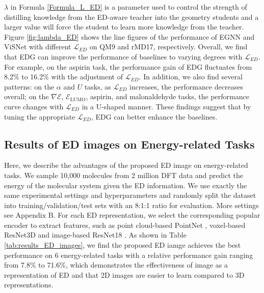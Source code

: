 \documentclass{article}
\begin{document}
$\lambda$ in Formula \ref{Formula_L_ED} is a parameter used to control the strength of distilling knowledge from the ED-aware teacher into the geometry students and a larger value will force the student to learn more knowledge from the teacher. Figure \ref{fig:lambda_ED} shows the line figures of the performance of EGNN and ViSNet with different $\mathcal{L}_{ED}$ on QM9 and rMD17, respectively. Overall, we find that EDG can improve the performance of baselines to varying degrees with $\mathcal{L}_{ED}$. For example, on the aspirin task, the performance gain of EDG fluctuates from 8.2\% to 16.2\% with the adjustment of $\mathcal{L}_{ED}$. In addition, we also find several patterns: on the $\alpha$ and $U$ tasks, as $\mathcal{L}_{ED}$ increases, the performance decreases overall; on the $\nabla \mathcal{E}$, $\mathcal{E}_\text{LUMO}$, aspirin, and malonaldehyde tasks, the performance curve changes with $\mathcal{L}_{ED}$ in a U-shaped manner. These findings suggest that by tuning the appropriate $\mathcal{L}_{ED}$, EDG can better enhance the baselines.




\subsection{Results of ED images on Energy-related Tasks}

Here, we describe the advantages of the proposed ED image on energy-related tasks. We sample 10,000 molecules from 2 million DFT data and predict the energy of the molecular system given the ED information. We use exactly the same experimental settings and hyperparameters and randomly split the dataset into training/validation/test sets with an 8:1:1 ratio for evaluation. More settings see Appendix B. For each ED representation, we select the corresponding popular encoder to extract features, such as point cloud-based PointNet \cite{qi2017pointnet}, voxel-based ResNet3D \cite{hara2018can} and image-based ResNet18 \cite{he2016deep}. As shown in Table \ref{tab:results_ED_images}, we find the proposed ED iamge achieves the best performance on 6 energy-related tasks with a relative performance gain ranging from 7.8\% to 71.6\%, which demonstrates the effectiveness of image as a representation of ED and that 2D images are easier to learn compared to 3D representations.
\end{document}
